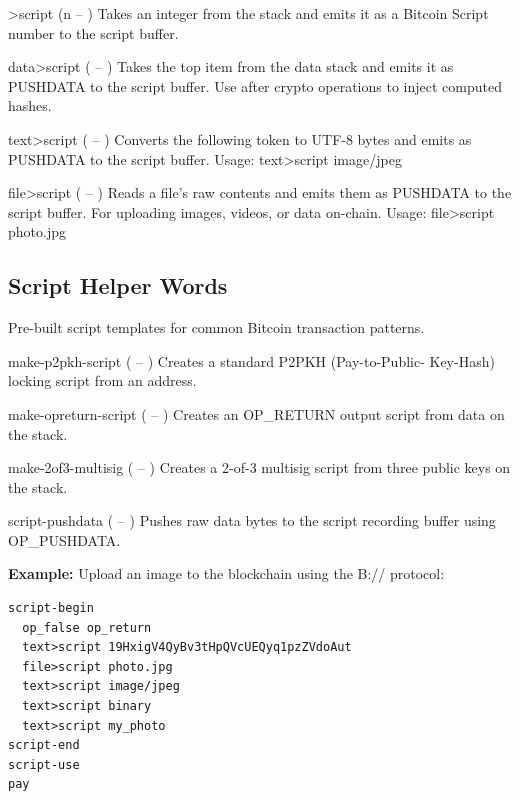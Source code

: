 \documentclass[a4paper, 11pt, openany]{book}
\begin{document}
\begin{forthbox}
  >script       (n -- )
                Takes an integer from the stack and emits it as a
                Bitcoin Script number to the script buffer.

  data>script   ( -- )
                Takes the top item from the data stack and emits
                it as PUSHDATA to the script buffer. Use after
                crypto operations to inject computed hashes.

  text>script   ( -- )
                Converts the following token to UTF-8 bytes and
                emits as PUSHDATA to the script buffer.
                Usage: text>script image/jpeg

  file>script   ( -- )
                Reads a file's raw contents and emits them as
                PUSHDATA to the script buffer. For uploading
                images, videos, or data on-chain.
                Usage: file>script photo.jpg
\end{forthbox}

\subsection{Script Helper Words}

Pre-built script templates for common Bitcoin transaction patterns.

\begin{forthbox}
  make-p2pkh-script     ( -- )
                        Creates a standard P2PKH (Pay-to-Public-
                        Key-Hash) locking script from an address.

  make-opreturn-script  ( -- )
                        Creates an OP\_RETURN output script from
                        data on the stack.

  make-2of3-multisig    ( -- )
                        Creates a 2-of-3 multisig script from
                        three public keys on the stack.

  script-pushdata       ( -- )
                        Pushes raw data bytes to the script
                        recording buffer using OP\_PUSHDATA.
\end{forthbox}

\begin{notebox}
\textbf{Example:} Upload an image to the blockchain using the B:// protocol:
\begin{lstlisting}
script-begin
  op_false op_return
  text>script 19HxigV4QyBv3tHpQVcUEQyq1pzZVdoAut
  file>script photo.jpg
  text>script image/jpeg
  text>script binary
  text>script my_photo
script-end
script-use
pay
\end{lstlisting}
\end{notebox}
\end{document}
